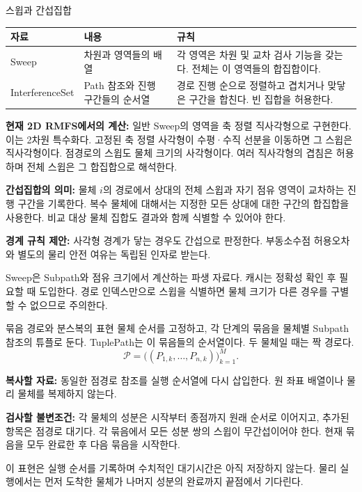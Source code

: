 \begin{frame}{스윕과 간섭집합}
\small
\begin{tabular}{p{2.5cm}p{4.2cm}p{5.6cm}}\toprule
자료 & 내용 & 규칙\\\midrule
Sweep & 차원과 영역들의 배열 & 각 영역은 차원 및 교차 검사 기능을 갖는다. 전체는 이 영역들의 합집합이다.\\
InterferenceSet & Path 참조와 진행 구간들의 순서열 & 경로 진행 순으로 정렬하고 겹치거나 맞닿은 구간을 합친다. 빈 집합을 허용한다.\\\bottomrule
\end{tabular}
\par\medskip
\textbf{현재 2D RMFS에서의 계산:} 일반 Sweep의 영역을 축 정렬 직사각형으로 구현한다.
이는 2차원 특수화다. 고정된 축 정렬 사각형이 수평·수직 선분을 이동하면
그 스윕은 직사각형이다. 점경로의 스윕도 물체 크기의 사각형이다.
여러 직사각형의 겹침은 허용하며 전체 스윕은 그 합집합으로 해석한다.
\par\medskip
\textbf{간섭집합의 의미:} 물체 $i$의 경로에서 상대의 전체 스윕과
자기 점유 영역이 교차하는 진행 구간을 기록한다.
복수 물체에 대해서는 지정한 모든 상대에 대한 구간의 합집합을 사용한다.
비교 대상 물체 집합도 결과와 함께 식별할 수 있어야 한다.
\par\medskip
\textbf{경계 규칙 제안:} 사각형 경계가 닿는 경우도 간섭으로 판정한다.
부동소수점 허용오차와 별도의 물리 안전 여유는 독립된 인자로 받는다.
\par\smallskip\footnotesize
Sweep은 Subpath와 점유 크기에서 계산하는 파생 자료다.
캐시는 정확성 확인 후 필요할 때 도입한다. 경로 인덱스만으로 스윕을 식별하면
물체 크기가 다른 경우를 구별할 수 없으므로 주의한다.
\end{frame}

\begin{frame}{묶음 경로와 분스복의 표현}
\small
물체 순서를 고정하고, 각 단계의 묶음을 물체별 Subpath 참조의 튜플로 둔다.
TuplePath는 이 묶음들의 순서열이다. 두 물체일 때는 짝 경로다.
\[
 \mathcal P=\bigl((P_{1,k},\ldots,P_{n,k})\bigr)_{k=1}^{M}.
\]
\begin{center}\end{center}
\textbf{복사할 자료:} 동일한 점경로 참조를 실행 순서열에 다시 삽입한다.
원 좌표 배열이나 물리 물체를 복제하지 않는다.
\par\medskip
\textbf{검사할 불변조건:}
각 물체의 성분은 시작부터 종점까지 원래 순서로 이어지고,
추가된 항목은 점경로 대기다. 각 묶음에서 모든 성분 쌍의 스윕이 무간섭이어야 한다.
현재 묶음을 모두 완료한 후 다음 묶음을 시작한다.
\par\medskip\footnotesize
이 표현은 실행 순서를 기록하며 수치적인 대기시간은 아직 저장하지 않는다.
물리 실행에서는 먼저 도착한 물체가 나머지 성분의 완료까지 끝점에서 기다린다.
\end{frame}

